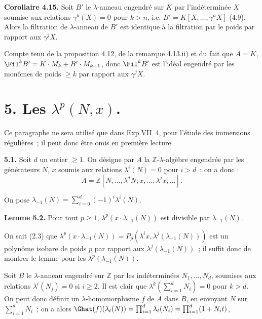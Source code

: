\textbf{Corollaire 4.15.} Soit \(B'\) le \(\lambda\)-anneau engendré sur \(K\) par l'indéterminée \(X\) soumise aux relations \(\gamma^k(X)=0\) pour \(k>n\), i.e. \(B'=K[X,\ldots,\gamma^n X]\) (4.9). Alors la filtration de \(\lambda\)-anneau de \(B'\) est identique à la filtration par le poids par rapport aux \(\gamma^j X\).

Compte tenu de la proposition 4.12, de la remarque 4.13.ii) et du fait que \(A=K\), \(\Fil^k B'=K\cdot M_k+B'\cdot M_{k+1}\), donc \(\Fil^k B'\) est l'idéal engendré par les monômes de poids \(\ge k\) par rapport aux \(\gamma^j X\).

\section*{5. Les \(\lambda^p(N,x)\).}

Ce paragraphe ne sera utilisé que dans Exp.VII~4, pour l'étude des immersions régulières~; il peut donc être omis en première lecture.

\textbf{5.1.} Soit \(d\) un entier \(\ge1\). On désigne par \(A\) la \(\mathbb Z\)-\(\lambda\)-algèbre engendrée par les générateurs \(N\), \(x\) soumis aux relations \(\lambda^i(N)=0\) pour \(i>d\)~; on a donc :
\[
  A=\mathbb Z[N,\ldots,\lambda^dN;
       x,\ldots,\lambda^jx,\ldots].
\]

On pose \(\lambda_{-1}(N)=\sum_{i=0}^{d}(-1)^i\lambda^i(N)\).

\textbf{Lemme 5.2.} Pour tout \(p\ge1\), \(\lambda^p(x\cdot\lambda_{-1}(N))\) est divisible par \(\lambda_{-1}(N)\).

On sait (2.3) que \(\lambda^p(x\cdot\lambda_{-1}(N))=P_p(\lambda^i x,\lambda^j(\lambda_{-1}(N)))\) est un polynôme isobare de poids \(p\) par rapport aux \(\lambda^j(\lambda_{-1}(N))\)~; il suffit donc de montrer le lemme pour les \(\lambda^p(\lambda_{-1}(N))\).

Soit \(B\) le \(\lambda\)-anneau engendré sur \(\mathbb Z\) par les indéterminées \(N_1,\ldots,N_d\), soumises aux relations \(\lambda^i(N_j)=0\) si \(i\ge2\). Il est clair que \(\lambda^k(\sum_{i=1}^{d}N_i)=0\) pour \(k>d\). On peut donc définir un \(\lambda\)-homomorphisme \(f\) de \(A\) dans \(B\), en envoyant \(N\) sur \(\sum_{i=1}^{d}N_i\)~; on a alors \(\Ghat(f)(\lambda_t(N))=\prod_{i=1}^{d}\lambda_t(N_i)=\prod_{i=1}^{d}(1+N_it)\),
